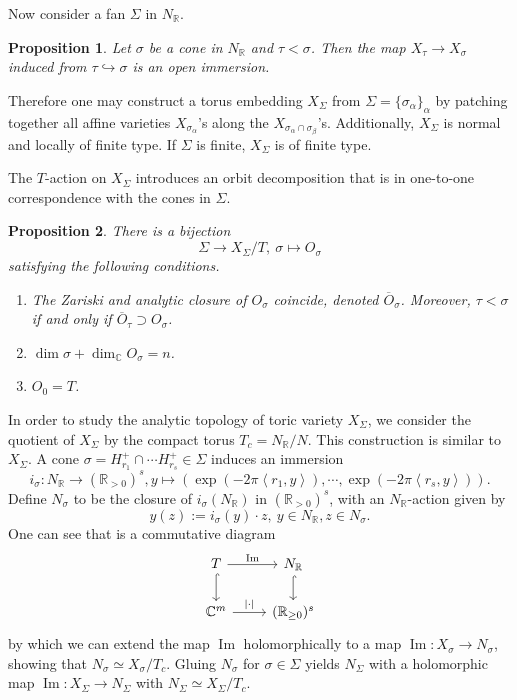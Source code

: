 \documentclass[11pt,english]{smfart}
\newtheorem{proposition}{Proposition}[section]
\theoremstyle{definition}
\theoremstyle{remark}
\newcommand{\R}{\mathbb{R}}
\renewcommand{\C}{\mathbb{C}}
\renewcommand{\Im}{\mathop{\mathrm{Im}}}
\renewcommand{\bar}{\overline}
\begin{document}
Now consider a fan $\Sigma$ in $N_\R$.
\begin{proposition}
    Let $\sigma$ be a cone in $N_\R$ and $\tau < \sigma$. Then the map $X_\tau\to X_\sigma$ induced from $\tau\hookrightarrow\sigma$ is an open immersion.
\end{proposition}
Therefore one may construct a torus embedding $X_{\Sigma}$ from $\Sigma = \{\sigma_\alpha\}_{\alpha}$ by patching together all affine varieties $X_{\sigma_\alpha}$'s along the $X_{\sigma_\alpha\cap\sigma_\beta}$'s.
Additionally, $X_{\Sigma}$ is normal and locally of finite type. If $\Sigma$ is finite, $X_{\Sigma}$ is of finite type.

The $T$-action on $X_{\Sigma}$ introduces an orbit decomposition that is in one-to-one correspondence with the cones in $\Sigma$.
\begin{proposition}
    There is a bijection \[\Sigma\to X_{\Sigma}/T,\ \sigma\mapsto O_\sigma\] satisfying the following conditions.\begin{enumerate}
        \item[(1)] The Zariski and analytic closure of $O_\sigma$ coincide, denoted $\bar{O}_\sigma$. Moreover, $\tau < \sigma$ if and only if $\bar{O}_\tau\supset O_\sigma$.
        \item[(2)] $\dim\sigma + \dim_{\C} O_\sigma = n$.
        \item[(3)] $O_0 = T$.
    \end{enumerate}
\end{proposition}

In order to study the analytic topology of toric variety $X_{\Sigma}$, we consider the quotient of $X_{\Sigma}$ by the compact torus $T_c=N_{\R}/N$. This construction is similar to $X_{\Sigma}$.
A cone $\sigma = H_{r_1}^+\cap\cdots H_{r_s}^+\in\Sigma$ induces an immersion\[i_\sigma: N_\R\to(\R_{ >0})^s, y\mapsto \left( \exp(-2\pi\left< r_1, y\right>),\cdots, \exp(-2\pi\left< r_s, y\right>) \right).\]
Define $N_\sigma$ to be the closure of $i_\sigma(N_\R)$ in $(\R_{ >0})^s$, with an $N_\R$-action given by \[y(z) := i_\sigma(y)\cdot z,\ y\in N_\R, z\in N_\sigma.\]
One can see that is a commutative diagram \[
\begin{tikzcd}
T \arrow[r, "\Im"] \arrow[d, hook] & N_\R \arrow[d, hook] \\
\C^m \arrow[r, "|\cdot|"]          & (\R_{\ge 0})^s      
\end{tikzcd}\]
by which we can extend the map $\Im$ holomorphically to a map $\Im: X_\sigma\to N_\sigma$, showing that $N_\sigma\simeq X_\sigma/T_c$.
Gluing $N_\sigma$ for $\sigma\in\Sigma$ yields $N_\Sigma$ with a holomorphic map $\Im:X_\Sigma\to N_\Sigma$ with $N_\Sigma\simeq X_\Sigma/T_c$.
\end{document}
